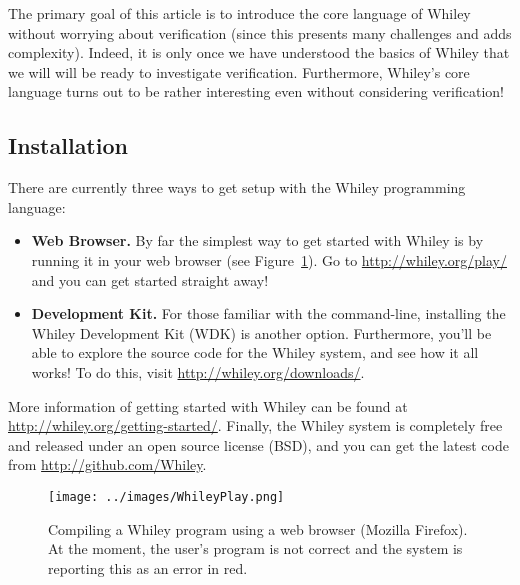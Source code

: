 The primary goal of this article is to introduce the core language of
Whiley without worrying about verification (since this presents many
challenges and adds complexity).  Indeed, it is only once we have
understood the basics of Whiley that we will will be ready to
investigate verification.  Furthermore, Whiley's core language turns
out to be rather interesting even without considering verification!

\subsection{Installation}

There are currently three ways to get setup with the Whiley
programming language:

\begin{itemize}
\item {\bf Web Browser.} By far the simplest way to get started with
  Whiley is by running it in your web browser (see
  Figure~\ref{whileyplay}).  Go to \url{http://whiley.org/play/} and
  you can get started straight away!
\item {\bf Development Kit.} For those familiar with the command-line,
  installing the Whiley Development Kit (WDK) is another option.
  Furthermore, you'll be able to explore the source code for the
  Whiley system, and see how it all works!  To do this, visit
  \url{http://whiley.org/downloads/}.
\end{itemize}

More information of getting started with Whiley can be found at
\url{http://whiley.org/getting-started/}.  Finally, the Whiley system
is completely free and released under an open source license (BSD),
and you can get the latest code from \url{http://github.com/Whiley}.

\begin{figure}[!t]
\centering
\texttt{[image: ../images/WhileyPlay.png]}
\caption{Compiling a Whiley program using a web browser (Mozilla
  Firefox).  At the moment, the user's program is not correct and the
  system is reporting this as an error in red.}
\label{whileyplay}
\end{figure}



